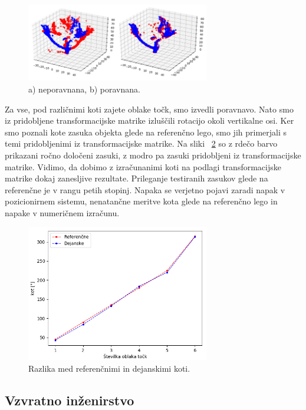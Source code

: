 \documentclass[journal,a4paper,twoside]{sty/IEEEtran}
\begin{document}
\begin{figure}[H]
	\centerline{\includegraphics[width=8cm]{fig/poravnava}}
	\caption{a) neporavnana, b) poravnana.}
	\label{fig:poravnava}
\end{figure}
%
Za vse, pod različnimi koti zajete oblake točk, smo izvedli poravnavo. Nato smo iz pridobljene transformacijske matrike izluščili rotacijo okoli vertikalne osi. Ker smo poznali kote zasuka objekta glede na referenčno lego, smo jih primerjali s temi pridobljenimi iz transformacijske matrike. Na sliki ~\ref{fig:poravnava_graf} so z rdečo barvo prikazani ročno določeni zasuki, z modro pa zasuki pridobljeni iz transformacijske matrike. Vidimo, da dobimo z izračunanimi koti na podlagi transformacijske matrike dokaj zanesljive rezultate. Prileganje testiranih zasukov glede na referenčne je v rangu petih stopinj. Napaka se verjetno pojavi zaradi napak v pozicionirnem sistemu, nenatančne meritve kota glede na referenčno lego in napake v numeričnem izračunu.

\begin{figure}[H]
	\centerline{\includegraphics[width=8cm]{fig/graf_poravnave}}
	\caption{Razlika med referenčnimi in dejanskimi koti.}
	\label{fig:poravnava_graf}
\end{figure}

\subsection{Vzvratno inženirstvo}
\end{document}
